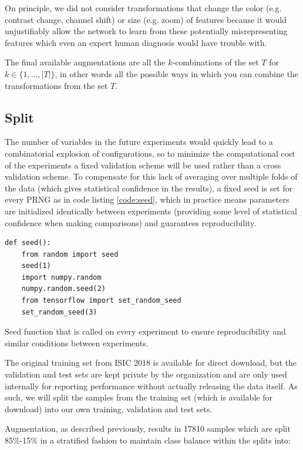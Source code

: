 On principle, we did not consider transformations that change the color (e.g. contrast change, channel shift) or size (e.g. zoom) of features because it would unjustifiably allow the network to learn from these potentially misrepresenting features which even an expert human diagnosis would have trouble with.

The final available augmentations are all the $k$-combinations of the set $T$ for $k \in \{1, ..., |T|\}$, in other words all the possible ways in which you can combine the transformations from the set $T$.

\subsection{Split}

The number of variables in the future experiments would quickly lead to a combinatorial explosion of configurations, so to minimize the computational cost of the experiments a fixed validation scheme will be used rather than a cross validation scheme. To compensate for this lack of averaging over multiple folds of the data (which gives statistical confidence in the results), a fixed seed is set for every \ac{PRNG} as in code listing \ref{code:seed}, which in practice means parameters are initialized identically between experiments (providing some level of statistical confidence when making comparisons) and guarantees reproducibility.

\begin{listing}[ht]
\begin{verbatim}
def seed():
    from random import seed
    seed(1)
    import numpy.random
    numpy.random.seed(2)
    from tensorflow import set_random_seed
    set_random_seed(3)
\end{verbatim}
\caption{Seed function that is called on every experiment to ensure reproducibility and similar conditions between experiments.}
\label{code:seed}
\end{listing}

The original training set from \ac{ISIC} 2018 is available for direct download, but the validation and test sets are kept private by the organization and are only used internally for reporting performance without actually releasing the data itself. As such, we will split the samples from the training set (which is available for download) into our own training, validation and test sets.

Augmentation, as described previously, results in 17810 samples which are split 85\%-15\% in a stratified fashion to maintain class balance within the splits into:

